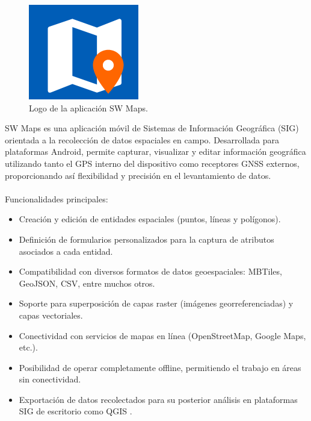 \begin{figure}[h]
    \centering
    \includegraphics[scale=0.5]{Graphics/sw_maps_logo.png}
    \caption{Logo de la aplicación SW Maps.}
    \label{fig:figura7}
\end{figure}
SW Maps es una aplicación móvil de Sistemas de Información Geográfica (SIG) orientada a la recolección de datos espaciales en campo. Desarrollada para plataformas Android, permite capturar, visualizar y editar información geográfica utilizando tanto el GPS interno del dispositivo como receptores GNSS externos, proporcionando así flexibilidad y precisión en el levantamiento de datos.\\\\
Funcionalidades principales:
\begin{itemize}
    \item Creación y edición de entidades espaciales (puntos, líneas y polígonos).
    \item Definición de formularios personalizados para la captura de atributos asociados a cada entidad.
    \item Compatibilidad con diversos formatos de datos geoespaciales: MBTiles, GeoJSON, CSV, entre muchos otros.
    \item Soporte para superposición de capas raster (imágenes georreferenciadas) y capas vectoriales.
    \item Conectividad con servicios de mapas en línea (OpenStreetMap, Google Maps, etc.).
    \item Posibilidad de operar completamente offline, permitiendo el trabajo en áreas sin conectividad.
    \item Exportación de datos recolectados para su posterior análisis en plataformas SIG de escritorio como QGIS \cite*{qgis}.
\end{itemize}

